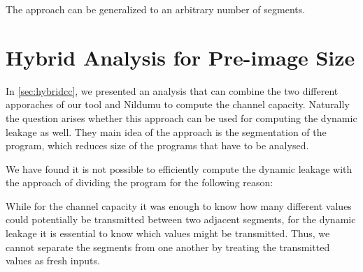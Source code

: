 The approach can be generalized to an arbitrary number of segments.

\section{Hybrid Analysis for Pre-image Size}
In \ref{sec:hybridcc}, we presented an analysis that can combine the two different apporaches of our tool and Nildumu to compute the channel capacity. Naturally the question arises whether this approach can be used for computing the dynamic leakage as well. They main idea of the approach is the segmentation of the program, which reduces size of the programs that have to be analysed.

We have found it is not possible to efficiently compute the dynamic leakage with the approach of dividing the program for the following reason:

While for the channel capacity it was enough to know how many different values could potentially be transmitted between two adjacent segments, for the dynamic leakage it is essential to know which values might be transmitted. Thus, we cannot separate the segments from one another by treating the transmitted values as fresh inputs.
